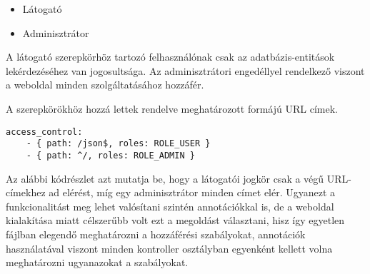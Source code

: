 \begin{itemize}
	\item Látogató
	\item Adminisztrátor
\end{itemize}

A látogató szerepkörhöz tartozó felhasználónak csak az adatbázis-entitások lekérdezéséhez van jogosultsága. 
Az adminisztrátori engedéllyel rendelkező viszont a weboldal minden szolgáltatásához hozzáfér. 

A szerepkörökhöz hozzá lettek rendelve meghatározott formájú URL címek. 

\begin{lstlisting}
access_control:
    - { path: /json$, roles: ROLE_USER }
    - { path: ^/, roles: ROLE_ADMIN }
\end{lstlisting}
Az alábbi kódrészlet azt mutatja be, hogy a látogatói jogkör csak a  végű URL-címekhez ad elérést, míg egy adminisztrátor minden címet elér. 
Ugyanezt a funkcionalitást meg lehet valósítani szintén annotációkkal is, de a weboldal kialakítása miatt célszerűbb volt ezt a megoldást választani, hisz így egyetlen fájlban elegendő meghatározni a hozzáférési szabályokat, annotációk használatával viszont minden kontroller osztályban egyenként kellett volna meghatározni ugyanazokat a szabályokat.
